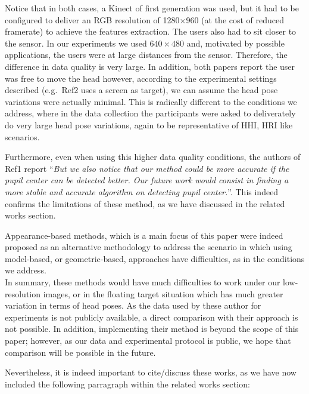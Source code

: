 {Notice that in both cases, a Kinect of first generation was used, but it had to be
configured to deliver an RGB resolution
of 1280$\times$960 (at the cost of reduced framerate) to achieve the features extraction. The users also had to sit closer to the sensor. In our experiments
we used $640\times480$
and, motivated by possible applications, the users were at large distances from the sensor. Therefore, the difference in data quality is very large.
In addition, both papers report the user was free to move the head however, according to the experimental settings described (e.g.~Ref2 uses a screen as target),
we can assume the head pose variations were actually minimal. This is radically different to the conditions we address, where in the data collection
the participants were asked to deliverately do very large head pose variations, again to be representative of HHI, HRI like scenarios.

Furthermore, even when using this higher data quality conditions, the authors of Ref1 report ``{\em But we also notice that our method could be more
accurate if the pupil center can be detected better. Our future
work would consist in finding a more stable and accurate
algorithm on detecting pupil center.}''. This indeed confirms the limitations of these method, as we have discussed in the related works section.

%
%
Appearance-based methods, which is a main focus of this paper  were indeed proposed as an alternative methodology to address
the scenario in which using model-based, or geometric-based, approaches have difficulties, as in the conditions we address. \\[1mm]
%
%
In summary, these methods would have much difficulties to work under our low-resolution images, or in the floating target situation which has much greater
variation in terms of head poses.
As the data used by these author for experiments is not publicly available, a direct comparison with their approach is not possible.
In addition, implementing their method is beyond the scope of this paper; however, as our data and experimental protocol
is public, we hope that comparison will be possible in the future.

Nevertheless, it is indeed important to cite/discuss these works, as we have now included the following parragraph within the related works section:

}
